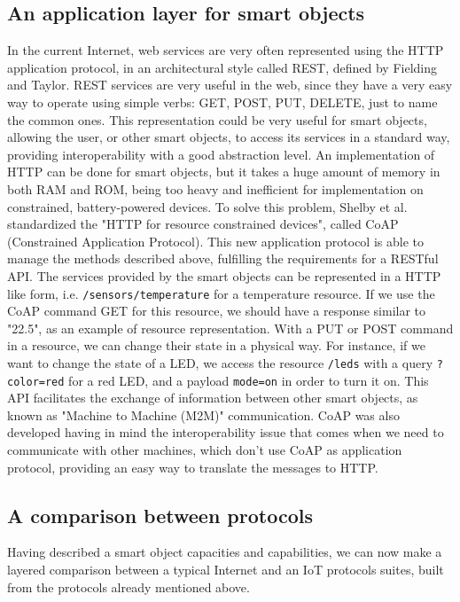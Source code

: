 \subsection{An application layer for smart objects}
In the current Internet, web services are very often represented using the HTTP application protocol, in an architectural style called REST, defined by Fielding and Taylor\cite{Fielding02REST}.
REST services are very useful in the web, since they have a very easy way to operate using simple verbs: GET, POST, PUT, DELETE, just to name the common ones.
This representation could be very useful for smart objects, allowing the user, or other smart objects, to access its services in a standard way, providing interoperability with a good abstraction level.
An implementation of HTTP can be done for smart objects, but it takes a huge amount of memory in both RAM and ROM, being too heavy and inefficient for implementation on constrained, battery-powered devices\cite{Shelby10EWS}.
To solve this problem, Shelby et al. standardized the "HTTP for resource constrained devices"\cite{rfc7252}, called CoAP (Constrained Application Protocol).
This new application protocol is able to manage the methods described above, fulfilling the requirements for a RESTful API.
The services provided by the smart objects can be represented in a HTTP like form, i.e. \texttt{/sensors/temperature} for a temperature resource. If we use the CoAP command GET for this resource, we should have a response similar to "22.5", as an example of resource representation.
With a PUT or POST command in a resource, we can change their state in a physical way.
For instance, if we want to change the state of a LED, we access the resource \texttt{/leds} with a query \texttt{?color=red} for a red LED, and a payload \texttt{mode=on} in order to turn it on.
This API facilitates the exchange of information between other smart objects, as known as "Machine to Machine (M2M)" communication.
CoAP was also developed having in mind the interoperability issue that comes when we need to communicate with other machines, which don't use CoAP as application protocol, providing an easy way to translate the messages to HTTP.

\subsection{A comparison between protocols}
Having described a smart object capacities and capabilities, we can now make a layered comparison between a typical Internet and an IoT protocols suites, built from the protocols already mentioned above.

